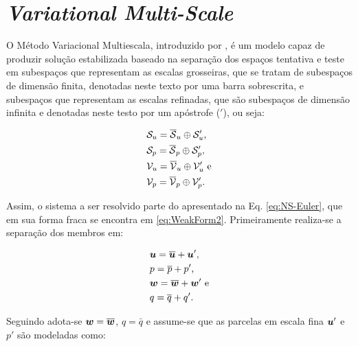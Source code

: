 \section{\textit{Variational Multi-Scale}} \label{VMS}

O Método Variacional Multiescala, introduzido por , é um modelo capaz de produzir solução estabilizada baseado na separação dos espaços tentativa e teste em subespaços que representam as escalas grosseiras, que se tratam de subespaços de dimensão finita, denotadas neste texto por uma barra sobrescrita, e subespaços que representam as escalas refinadas, que são subespaços de dimensão infinita e denotadas neste testo por um apóstrofe ($'$), ou seja:

\begin{subequations}
    \begin{align}
         & \mathcal{S}_u=\overline{\mathcal{S}}_u\oplus\mathcal{S}'_u\text{,}  \\
         & \mathcal{S}_p=\overline{\mathcal{S}}_p\oplus\mathcal{S}'_p\text{,}  \\
         & \mathcal{V}_u=\overline{\mathcal{V}}_u\oplus\mathcal{V}'_u\text{ e} \\
         & \mathcal{V}_p=\overline{\mathcal{V}}_p\oplus\mathcal{V}'_p\text{.}
    \end{align}
\end{subequations}

Assim, o sistema a ser resolvido parte do apresentado na Eq. \eqref{eq:NS-Euler}, que em sua forma fraca se encontra em \eqref{eq:WeakForm2}. Primeiramente realiza-se a separação dos membros em:

\begin{subequations}
    \begin{align}
         & \boldsymbol{u}=\overline{\boldsymbol{u}}+\boldsymbol{u}'\text{,}  \\
         & p=\overline{p}+p'\text{,}            \\
         & \boldsymbol{w}=\overline{\boldsymbol{w}}+\boldsymbol{w}'\text{ e} \\
         & q=\overline{q}+q'\text{.}
    \end{align}
\end{subequations}

Seguindo  adota-se $\boldsymbol{w}=\overline{\boldsymbol{w}}$, $q=\bar{q}$ e assume-se que as parcelas em escala fina $\boldsymbol{u}'$ e $p'$ são modeladas como:

